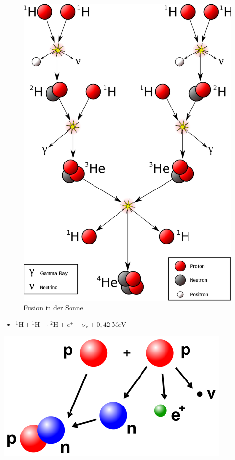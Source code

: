 \documentclass[10pt,a4paper, ngerman]{beamer}
\begin{document}
\begin{frame}[fragile]{\subsecname}{\secname}
\begin{figure}
\centering
\includegraphics[height=0.8\textheight]{fusion-in-der-sonne}
\caption{Fusion in der Sonne}
\label{fig:fusion-in-der-sonne2}
\end{figure}
\end{frame}

\begin{frame}{\subsecname}{\secname}
\begin{itemize}
\item \({\displaystyle \mathrm {{}^{1}H+{}^{1}H\to {}^{2}H+e^{+}+\nu _{e}+0{,}42\;MeV} }\)
\end{itemize}
\centering
\includegraphics[height=0.4\textheight]{fids1}
\end{frame}
\end{document}
